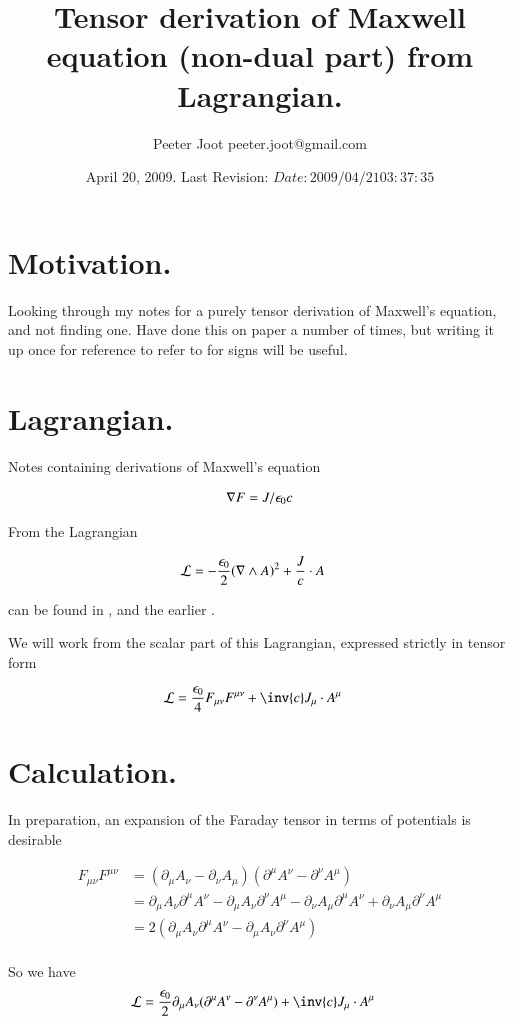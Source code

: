\documentclass{article}
\title{ Tensor derivation of Maxwell equation (non-dual part) from Lagrangian. }
\author{Peeter Joot \quad peeter.joot@gmail.com }
\date{ April 20, 2009.  Last Revision: $Date: 2009/04/21 03:37:35 $ }
\begin{document}
\maketitle{}
\tableofcontents
\section{ Motivation. }

Looking through my notes for a purely tensor derivation of Maxwell's equation, and not finding one.  Have done this on
paper a number of times, but writing it up once for reference to refer to for signs will be useful.

\section{ Lagrangian. }

Notes containing derivations of Maxwell's equation

\begin{align}
\nabla F = J/\epsilon_0 c
\end{align}

From the Lagrangian

\begin{align}\label{eqn:maxlag}
\mathcal{L} &= -\frac{\epsilon_0}{2} (\nabla \wedge A)^2 + \frac{J}{c} \cdot A
\end{align}

can be found in \cite{PJFieldLagrangian}, and the earlier \cite{PJMaxwellLagrangian}.

We will work from the scalar part of this Lagrangian, expressed strictly in tensor form

\begin{align}
\LL &= \frac{\epsilon_0}{4} F_{\mu\nu}F^{\mu\nu} + \inv{c} J_\mu \cdot A^\mu
\end{align}

\section{ Calculation. }

In preparation, an expansion of the Faraday tensor in terms of potentials is desirable

\begin{align*}
F_{\mu\nu}F^{\mu\nu}
&=
(\partial_\mu A_\nu - \partial_\nu A_\mu) (\partial^\mu A^\nu - \partial^\nu A^\mu) \\
&=
\partial_\mu A_\nu \partial^\mu A^\nu 
-\partial_\mu A_\nu \partial^\nu A^\mu
- \partial_\nu A_\mu \partial^\mu A^\nu 
+ \partial_\nu A_\mu \partial^\nu A^\mu \\
&=
2 (\partial_\mu A_\nu \partial^\mu A^\nu - \partial_\mu A_\nu \partial^\nu A^\mu)
\\
\end{align*}

So we have
\begin{align*}
\LL &= \frac{\epsilon_0}{2} \partial_\mu A_\nu (\partial^\mu A^\nu - \partial^\nu A^\mu)
+ \inv{c} J_\mu \cdot A^\mu
\end{align*}



\end{document}
